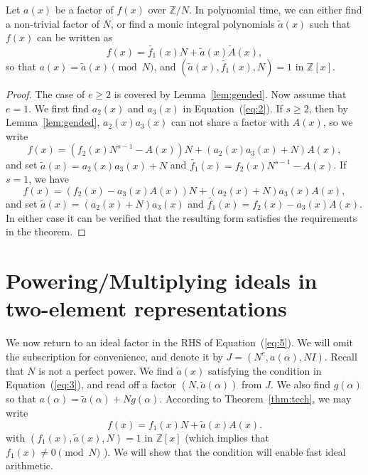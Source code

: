 \documentclass[runningheads, letter]{llncs}
\newcommand{\Z}{{\mathbb Z}}
\begin{document}
\begin{theorem} \label{thm:tech}
  Let \( a(x) \) be a factor of \( f(x) \) over \( \Z/N \).
  In polynomial time, we can either find a non-trivial
  factor of \( N \),
  or find a monic integral polynomials \( \tilde{a} (x) \)
  such that \( f(x) \) can be written as  
  \begin{equation}
\label{eq:3}
 f(x) =\tilde{f_1}(x) N + \tilde{a}(x) \tilde{A}(x), 
  \end{equation}
  so that \( a(x)=\tilde{a} (x)  \pmod{N} \),
  and \( (\tilde{a} (x), \tilde{f_1}(x), N)=1 \) in \( \Z[x] \).
\end{theorem}

\begin{proof}
  The case of \( e\geq 2 \) is covered by Lemma~\ref{lem:gended}.
  Now assume that \( e=1 \).
  We first find \( a_2(x) \) and \( a_3(x) \) in Equation~(\ref{eq:2}).
  If \( s\geq 2 \), then by Lemma~\ref{lem:gended},
  \( a_2(x) a_3(x) \) can not share a factor with
  \( A(x) \), so we write
  \[ f(x) = (f_2(x) N^{s-1} -   A(x)) N +
    ( a_2 (x)  a_3 (x)+ N ) A(x), \]
  and set \( \tilde{a}(x) =  a_2 (x)  a_3 (x)+ N \)
  and \( \tilde{f_1}(x) = f_2(x) N^{s-1} -   A(x) \).
  If \( s= 1 \), we have
  \[ f(x) = (f_2(x)  -  a_3(x) A(x)) N +
    ( a_2 (x) + N ) a_3 (x) A(x), \]
  and set \( \tilde{a}(x) = ( a_2 (x) + N ) a_3 (x) \)
  and \( \tilde{f_1}(x) = f_2(x)  -  a_3(x) A(x) \).
  In either case
  it can be verified that the resulting form satisfies
  the requirements in the theorem.
\end{proof}

\section{Powering/Multiplying ideals in two-element representations}
\label{sec:powerandmulti}
We now return to an ideal
factor in the RHS of Equation~(\ref{eq:5}).
We will omit the subscription for convenience,
and denote it by \( J =  (N^e, a(\alpha), N I ) \). 
Recall that \( N \) is not a perfect power.
We find \( \tilde{a}(x) \) satisfying
the condition in Equation~(\ref{eq:3}),
and read off a factor \( (N, \tilde{a} (\alpha)) \) from \( J \).
We also find \( g(\alpha) \)
so that \( a(\alpha) = \tilde{a}(\alpha) + N g(\alpha) \).
%
%
According to Theorem~\ref{thm:tech}, we may write
\begin{equation}\label{eq:4} 
 f(x) = f_1 (x) N + \tilde{a} (x) A(x).  
\end{equation}
with \( (f_1(x), \tilde{a}(x), N) = 1 \) in \( \Z[x] \)
(which implies that \( f_1(x) \not= 0 \pmod{N} \) ). 
We will show that the condition will enable fast ideal arithmetic.
\end{document}
